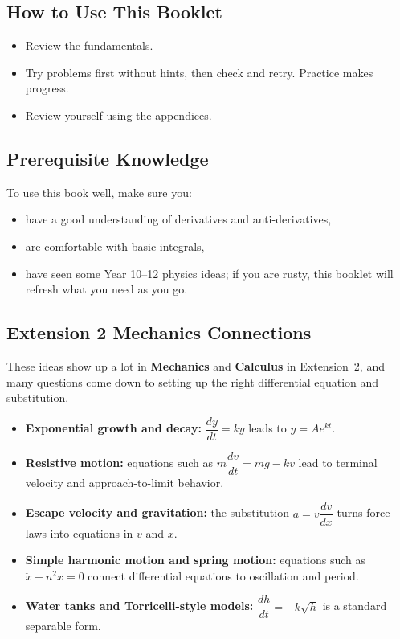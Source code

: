 \documentclass[12pt]{article}
\begin{document}
\subsection{How to Use This Booklet}
\begin{itemize}[leftmargin=*]
  \item Review the fundamentals.
  \item Try problems first without hints, then check and retry. Practice makes progress.
  \item Review yourself using the appendices.
\end{itemize}

\subsection{Prerequisite Knowledge}
To use this book well, make sure you:
\begin{itemize}[leftmargin=*]
  \item have a good understanding of derivatives and anti-derivatives,
  \item are comfortable with basic integrals,
  \item have seen some Year 10--12 physics ideas; if you are rusty, this booklet will refresh what you need as you go.
\end{itemize}

\subsection{Extension 2 Mechanics Connections}
These ideas show up a lot in \textbf{Mechanics} and \textbf{Calculus} in Extension~2, and many questions come down to setting up the right differential equation and substitution.

\begin{itemize}[leftmargin=*]
  \item \textbf{Exponential growth and decay:} $\dfrac{dy}{dt}=ky$ leads to $y=Ae^{kt}$.
  \item \textbf{Resistive motion:} equations such as $m\dfrac{dv}{dt}=mg-kv$ lead to terminal velocity and approach-to-limit behavior.
  \item \textbf{Escape velocity and gravitation:} the substitution $a=v\dfrac{dv}{dx}$ turns force laws into equations in $v$ and $x$.
  \item \textbf{Simple harmonic motion and spring motion:} equations such as $\ddot{x}+n^2x=0$ connect differential equations to oscillation and period.
  \item \textbf{Water tanks and Torricelli-style models:} $\dfrac{dh}{dt}=-k\sqrt{h}$ is a standard separable form.
\end{itemize}
\end{document}
